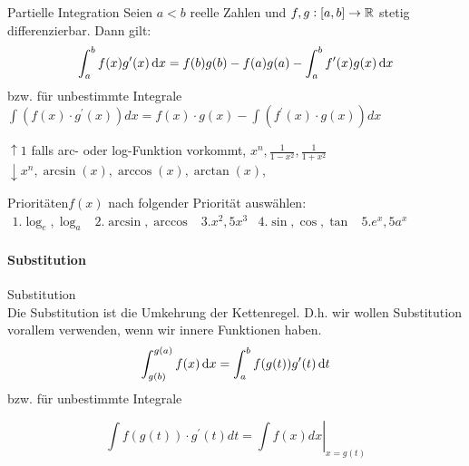 \begin{concept}{Partielle Integration}
	Seien $a < b$ reelle Zahlen und $f,g:[a,b] \to \mathbb{R}$ stetig differenzierbar. Dann gilt:
   \begin{equation*}
	   \int_a^b f(x) g'(x) \dif x = f(b) g(b) - f(a) g(a) - \int_a^b f'(x)g(x) \dif x
   \end{equation*}
   bzw. für unbestimmte Integrale\\

   $
   \int\left(f(x) \cdot g^{\prime}(x)\right) d x=f(x) \cdot g(x)-\int\left(f^{\prime}(x) \cdot g(x)\right) d x
   $
\end{concept}
\begin{remark}
   $\uparrow 1$ falls arc- oder log-Funktion vorkommt, $x^{n}, \frac{1}{1-x^{2}}, \frac{1}{1+x^{2}}$\\

   $\downarrow x^{n}, \arcsin (x), \arccos (x), \arctan (x)$,
\end{remark}
\begin{KR}{Prioritäten}$f(x)$ nach folgender Priorität auswählen:\\
   $
   \begin{array}{lllll}
	   1. \log_e, \log_a  & 2. \arcsin, \arccos &  3. x^2, 5x^3 & 4. \sin, \cos, \tan & 5. e^x, 5a^x
   \end{array}
   $
\end{KR}

\paragraph*{Substitution}

\begin{concept}{Substitution}\\
    Die Substitution ist die Umkehrung der Kettenregel. D.h. wir wollen Substitution vorallem verwenden, wenn wir innere Funktionen haben.
    \begin{equation*}
        \int_{g(b)}^{g(a)} f(x) \dif x = \int_{a}^b f(g(t)) g'(t) \dif t
    \end{equation*}
    bzw. für unbestimmte Integrale

    $$
    \int f(g(t)) \cdot g^{\prime}(t) d t=\left.\int f(x) d x\right|_{x=g(t)}
    $$
\end{concept}





